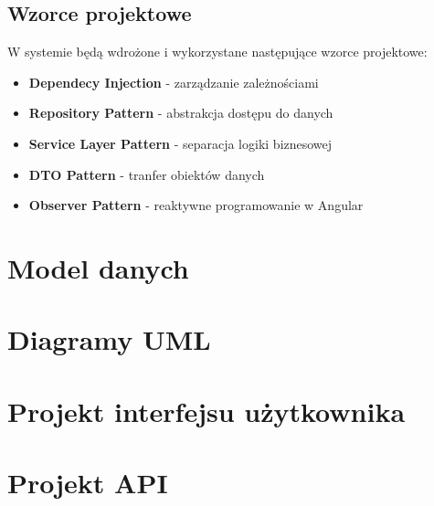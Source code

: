 \subsection{Wzorce projektowe}
W systemie będą wdrożone i wykorzystane następujące wzorce projektowe:
\begin{itemize}
	\item \textbf{Dependecy Injection} - zarządzanie zależnościami
	\item \textbf{Repository Pattern} - abstrakcja dostępu do danych
	\item \textbf{Service Layer Pattern} - separacja logiki biznesowej
	\item \textbf{DTO Pattern} - tranfer obiektów danych
	\item \textbf{Observer Pattern} - reaktywne programowanie w Angular
\end{itemize}

\section{Model danych}

\section{Diagramy UML}

\section{Projekt interfejsu użytkownika}

\section{Projekt API}

